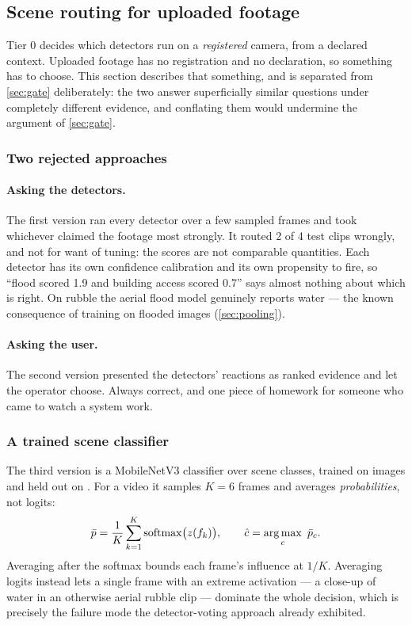 \subsection{Scene routing for uploaded footage}
\label{sec:routing}

Tier 0 decides which detectors run on a \emph{registered} camera, from a
declared context. Uploaded footage has no registration and no declaration, so
something has to choose. This section describes that something, and is
separated from \cref{sec:gate} deliberately: the two answer superficially
similar questions under completely different evidence, and conflating them
would undermine the argument of \cref{sec:gate}.

\subsubsection{Two rejected approaches}

\paragraph{Asking the detectors.} The first version ran every detector over a
few sampled frames and took whichever claimed the footage most strongly. It
routed 2 of 4 test clips wrongly, and not for want of tuning: the scores are
not comparable quantities. Each detector has its own confidence calibration
and its own propensity to fire, so ``flood scored 1.9 and building access
scored 0.7'' says almost nothing about which is right. On rubble the aerial
flood model genuinely reports water — the known consequence of training on
\AerialFlooded{} flooded images (\cref{sec:pooling}).

\paragraph{Asking the user.} The second version presented the detectors'
reactions as ranked evidence and let the operator choose. Always correct, and
one piece of homework for someone who came to watch a system work.

\subsubsection{A trained scene classifier}

The third version is a MobileNetV3 classifier over \RouterClasses{} scene
classes, trained on \RouterTrainImages{} images and held out on
\RouterHeldOut{}. For a video it samples $K = 6$ frames and averages
\emph{probabilities}, not logits:
\begin{equation}
  \bar{p} = \frac{1}{K} \sum_{k=1}^{K} \operatorname{softmax}\bigl(z(f_k)\bigr),
  \qquad
  \hat{c} = \operatorname*{arg\,max}_{c} \ \bar{p}_c .
  \label{eq:router}
\end{equation}
Averaging after the softmax bounds each frame's influence at $1/K$. Averaging
logits instead lets a single frame with an extreme activation — a close-up of
water in an otherwise aerial rubble clip — dominate the whole decision, which
is precisely the failure mode the detector-voting approach already exhibited.

